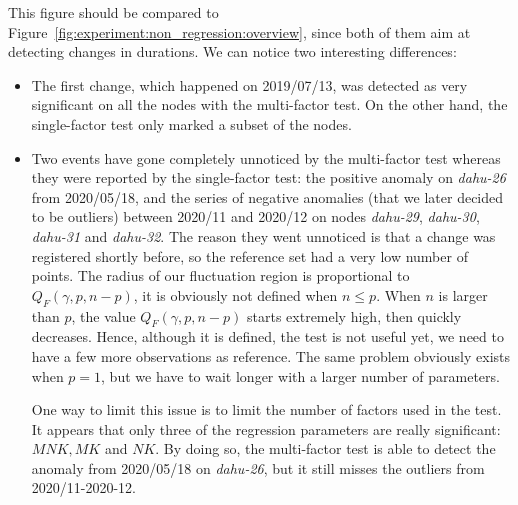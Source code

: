                 This figure should be compared to Figure~\ref{fig:experiment:non_regression:overview}, since both of
                them aim at detecting changes in \dgemm durations. We can notice two interesting differences:
                \begin{itemize}
                    \item The first change, which happened on 2019/07/13, was detected as very significant on all the
                        nodes with the multi-factor test. On the other hand, the single-factor test only marked a subset
                        of the nodes.
                    \item Two events have gone completely unnoticed by the multi-factor test whereas they were reported
                        by the single-factor test: the positive anomaly on \emph{dahu-26} from 2020/05/18, and the series of
                        negative anomalies (that we later decided to be outliers) between 2020/11 and 2020/12 on nodes
                        \emph{dahu-29}, \emph{dahu-30}, \emph{dahu-31} and \emph{dahu-32}. The reason they went
                        unnoticed is that a change was registered shortly before, so the reference set had a very low
                        number of points. The radius of our fluctuation region is proportional to \(Q_F(\gamma, p,
                        n-p)\), it is obviously not defined when \(n \leq p\). When \(n\) is larger than \(p\), the value
                        \(Q_F(\gamma, p, n-p)\) starts extremely high, then quickly decreases. Hence, although it is
                        defined, the test is not useful yet, we need to have a few more observations as reference.
                        The same problem obviously exists when \(p=1\), but we have to wait longer with a larger number
                        of parameters.

                        One way to limit this issue is to limit the number of factors used in the test. It appears that
                        only three of the regression parameters are really significant: \(MNK, MK\) and \(NK\). By doing
                        so, the multi-factor test is able to detect the anomaly from 2020/05/18 on \emph{dahu-26}, but
                        it still misses the outliers from 2020/11-2020-12.
                \end{itemize}
